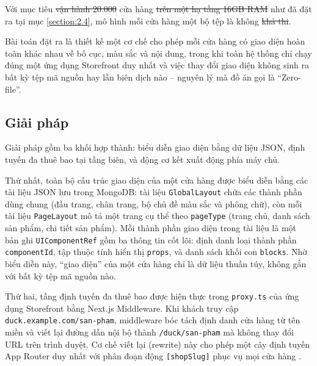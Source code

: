 \documentclass[../main.tex]{subfiles}
\providecommand{\DIFadd}[1]{{\protect\color{blue}\uwave{#1}}} %
\providecommand{\DIFdel}[1]{{\protect\color{red}\sout{#1}}} %
\providecommand{\DIFaddbegin}{} %
\providecommand{\DIFaddend}{} %
\providecommand{\DIFdelbegin}{} %
\providecommand{\DIFdelend}{} %
\begin{document}
\DIFaddend Với mục tiêu \DIFdelbegin \DIFdel{vận hành 20.000 }\DIFdelend \DIFaddbegin \DIFadd{giữ chi phí biên cho mỗi }\DIFaddend cửa hàng \DIFdelbegin \DIFdel{trên một hạ tầng 16GB RAM }\DIFdelend \DIFaddbegin \DIFadd{ở mức thấp }\DIFaddend như đã đặt ra tại mục \ref{section:2.4}, mô hình mỗi cửa hàng một bộ tệp là không \DIFdelbegin \DIFdel{khả thi}\DIFdelend \DIFaddbegin \DIFadd{phù hợp}\DIFaddend .

Bài toán đặt ra là thiết kế một cơ chế cho phép mỗi cửa hàng có giao diện hoàn toàn khác nhau về bố cục, màu sắc và nội dung, trong khi toàn hệ thống chỉ chạy đúng một ứng dụng Storefront duy nhất và việc thay đổi giao diện không sinh ra bất kỳ tệp mã nguồn hay lần biên dịch nào -- nguyên lý mà đồ án gọi là ``Zero-file''.

\subsection{Giải pháp}
\label{subsection:5.2.2}

Giải pháp gồm ba khối hợp thành: biểu diễn giao diện bằng dữ liệu JSON, định tuyến đa thuê bao tại tầng biên, và động cơ kết xuất động phía máy chủ.

Thứ nhất, toàn bộ cấu trúc giao diện của một cửa hàng được biểu diễn bằng các tài liệu JSON lưu trong MongoDB: tài liệu \texttt{GlobalLayout} chứa các thành phần dùng chung (đầu trang, chân trang, bộ chủ đề màu sắc và phông chữ), còn mỗi tài liệu \texttt{PageLayout} mô tả một trang cụ thể theo \texttt{pageType} (trang chủ, danh sách sản phẩm, chi tiết sản phẩm). Mỗi thành phần giao diện trong tài liệu là một bản ghi \texttt{UIComponentRef} gồm ba thông tin cốt lõi: định danh loại thành phần \texttt{componentId}, tập thuộc tính hiển thị \texttt{props}, và danh sách khối con \texttt{blocks}. Nhờ biểu diễn này, ``giao diện'' của một cửa hàng chỉ là dữ liệu thuần túy, không gắn với bất kỳ tệp mã nguồn nào.

Thứ hai, tầng định tuyến đa thuê bao được hiện thực trong \texttt{proxy.ts} của ứng dụng Storefront bằng Next.js Middleware. Khi khách truy cập \texttt{duck.example.com/san-pham}, middleware bóc tách định danh cửa hàng từ tên miền và viết lại đường dẫn nội bộ thành \texttt{/duck/san-pham} mà không thay đổi URL trên trình duyệt. Cơ chế viết lại (rewrite) này cho phép một cây định tuyến App Router duy nhất với phân đoạn động \texttt{[shopSlug]} phục vụ mọi cửa hàng \cite{nextjs_docs}.
\end{document}
